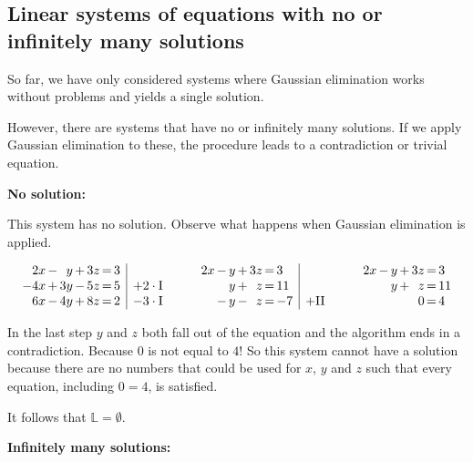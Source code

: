 \documentclass[12pt,eng]{skript_ogg}
\begin{document}
\subsection{Linear systems of equations with no or infinitely many solutions}
So far, we have only considered systems where Gaussian elimination works without problems and yields a single solution.

However, there are systems that have no or infinitely many solutions. If we apply Gaussian elimination to these, the procedure leads to a contradiction or trivial equation.

\textbf{No solution:}

This system has no solution. Observe what happens when Gaussian elimination is applied.

\[\begin{array}{r@{\,}c@{\,}r@{\,}c@{\,}r@{\,}c@{\,}l|l}
2x & - & y & + & 3z & = & 3 &\\
-4x & + & 3y & - & 5z & = & 5 & +2\cdot\mbox{I}\\
6x & - & 4y & + & 8z & = & 2 & -3\cdot\mbox{I}
\end{array}\qquad\begin{array}{r@{\,}c@{\,}r@{\,}c@{\,}r@{\,}c@{\,}l|l}
2x & - & y & + & 3z & = & 3 &\\
 & & y & + & z & = & 11 &\\
 & - & y & - & z & = & -7 &+\mbox{II}
\end{array}\qquad\begin{array}{r@{\,}c@{\,}r@{\,}c@{\,}r@{\,}c@{\,}l}
2x & - & y & + & 3z & = & 3 \\
 & & y & + & z & = & 11 \\
 & & & & 0 & = & 4
\end{array}\]

In the last step $y$ and $z$ both fall out of the equation and the algorithm ends in a contradiction. Because $0$ is not equal to $4$! So this system cannot have a solution because there are no numbers that could be used for $x$, $y$ and $z$ such that every equation, including $0=4$, is satisfied.

It follows that $\mathbb{L}=\emptyset$.

\textbf{Infinitely many solutions:}
\end{document}
